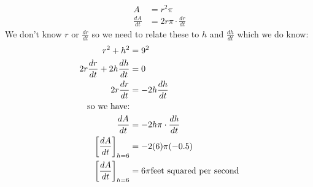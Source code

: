 \documentclass[nooutcomes,handout]{ximera}
\begin{document}
\begin{problem}
\begin{freeResponse}
	\begin{align*}
	A&=r^2\pi\\
	\frac{dA}{dt}&=2r\pi \cdot \frac{dr}{dt} 
	\end{align*}
	We don't know $r$ or $\frac{dr}{dt}$ so we need to relate these to $h$ and $\frac{dh}{dt}$ which we do know:\\
	\begin{align*}
	r^2+h^2&=9^2\\
	2r\frac{dr}{dt}+2h\frac{dh}{dt}&=0\\
	2r\frac{dr}{dt}&=-2h\frac{dh}{dt}\\
	\text{so we have:}&\\
	\frac{dA}{dt}&=-2h\pi \cdot \frac{dh}{dt} \\
	\bigg[ \frac{dA}{dt} \bigg]_{h=6}&=-2(6)\pi (-0.5)\\
	\bigg[ \frac{dA}{dt} \bigg]_{h=6}&=6\pi \text{feet squared per second}
	\end{align*}

\end{freeResponse}
\end{problem}
\end{document}
